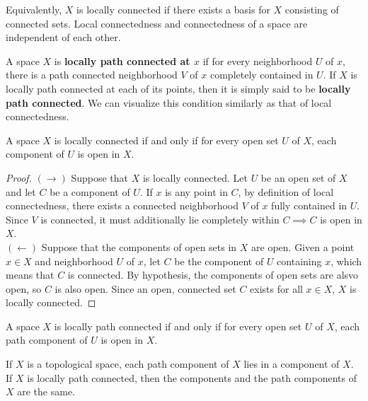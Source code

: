     Equivalently, $X$ is locally connected if there exists a basis for $X$ consisting of connected sets. Local connectedness and connectedness of a space are independent of each other. 

    \begin{definition}
    A space $X$ is \textbf{locally path connected at $x$} if for every neighborhood $U$ of $x$, there is a path connected neighborhood $V$ of $x$ completely contained in $U$. If $X$ is locally path connected at each of its points, then it is simply said to be \textbf{locally path connected}. We can visualize this condition similarly as that of local connectedness. 
    \end{definition}

    \begin{theorem}
    A space $X$ is locally connected if and only if for every open set $U$ of $X$, each component of $U$ is open in $X$. 
    \end{theorem}
    \begin{proof}
    $(\rightarrow)$ Suppose that $X$ is locally connected. Let $U$ be an open set of $X$ and let $C$ be a component of $U$. If $x$ is any point in $C$, by definition of local connectedness, there exists a connected neighborhood $V$ of $x$ fully contained in $U$. Since $V$ is connected, it must additionally lie completely within $C \implies C$ is open in $X$. \\
    $(\leftarrow)$ Suppose that the components of open sets in $X$ are open. Given a point $x \in X$ and neighborhood $U$ of $x$, let $C$ be the component of $U$ containing $x$, which means that $C$ is connected. By hypothesis, the components of open sets are alsvo open, so $C$ is also open. Since an open, connected set $C$ exists for all $x \in X$, $X$ is locally connected. 
    \end{proof}

    \begin{theorem}
    A space $X$ is locally path connected if and only if for every open set $U$ of $X$, each path component of $U$ is open in $X$.
    \end{theorem}

    \begin{theorem}
    If $X$ is a topological space, each path component of $X$ lies in a component of $X$. If $X$ is locally path connected, then the components and the path components of $X$ are the same. 
    \end{theorem}

